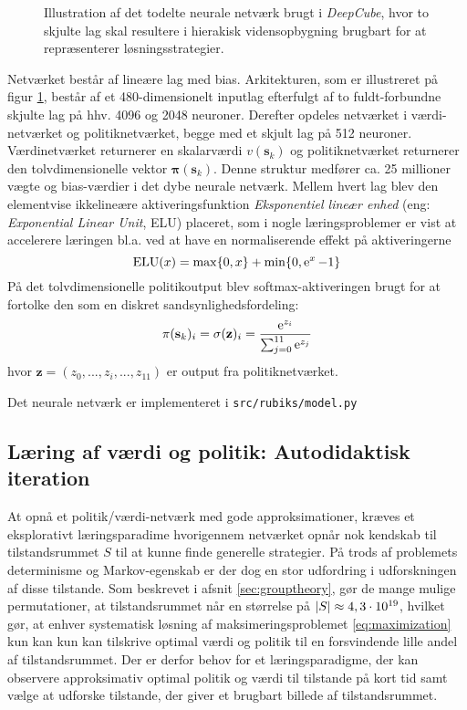 \documentclass[../main.tex]{subfiles}
\begin{document}
\begin{figure}[H]
	\centering

\caption{Illustration af det todelte neurale netværk brugt i \textit{DeepCube}, hvor to skjulte lag skal resultere i hierakisk vidensopbygning brugbart for at repræsenterer løsningsstrategier.}
\label{fig:DNN}
\end{figure}
\noindent Netværket består af lineære lag med bias.  Arkitekturen, som er illustreret på figur \ref{fig:DNN}, består af et 480-dimensionelt inputlag efterfulgt af to fuldt-forbundne skjulte lag på hhv. 4096 og 2048 neuroner. Derefter opdeles netværket i værdi-netværket og politiknetværket, begge med et skjult lag på 512 neuroner. Værdinetværket returnerer en skalarværdi \(v(\mathbf s_k)\) og politiknetværket returnerer den tolvdimensionelle vektor \(\bm \pi (\mathbf s_k)\). Denne struktur medfører ca. 25 millioner vægte og bias-værdier i det dybe neurale netværk. Mellem hvert lag blev den elementvise ikkelineære aktiveringsfunktion \textit{Eksponentiel lineær enhed} (eng: \textit{Exponential Linear Unit}, ELU) placeret, som i nogle læringsproblemer er vist at accelerere læringen bl.a. ved at have en normaliserende effekt på aktiveringerne \cite{ELU} 
\[
\operatorname{ELU}(x) = \operatorname*{max}\{0, x\} + \operatorname{min}\{0, \operatorname{e}^{x} -1\}
\]
På det tolvdimensionelle politikoutput blev softmax-aktiveringen brugt for at fortolke den som en diskret sandsynlighedsfordeling:
\[
\pi(\mathbf s_k)_i = \sigma(\mathbf z)_i = \frac{\operatorname{e}^{z_i}}{\sum_{j=0}^{11} \operatorname{e}^{z_j}}
\]
hvor \(\mathbf z=(z_0, ..., z_i, ..., z_{11})\) er output fra politiknetværket.

Det neurale netværk er implementeret i \texttt{src/rubiks/model.py}

\subsection*{Læring af værdi og politik: Autodidaktisk iteration}
At opnå et politik/værdi-netværk med gode approksimationer, kræves et eksplorativt læringsparadime hvorigennem netværket opnår nok kendskab til tilstandsrummet \(S\) til at kunne finde generelle strategier. 
På trods af problemets determinisme og Markov-egenskab er der dog en stor udfordring i udforskningen af disse tilstande.
Som beskrevet i afsnit \ref{sec:grouptheory}, gør de mange mulige permutationer, at tilstandsrummet når en størrelse på \(|S|\approx 4,3\cdot10^{19}\), hvilket gør, at enhver systematisk løsning af maksimeringsproblemet \ref{eq:maximization} kun kan kun kan tilskrive optimal værdi og politik til en forsvindende lille andel af tilstandsrummet.
Der er derfor behov for et læringsparadigme, der kan observere approksimativ optimal politik og værdi til tilstande på kort tid samt vælge at udforske tilstande, der giver et brugbart billede af tilstandsrummet.
\end{document}
